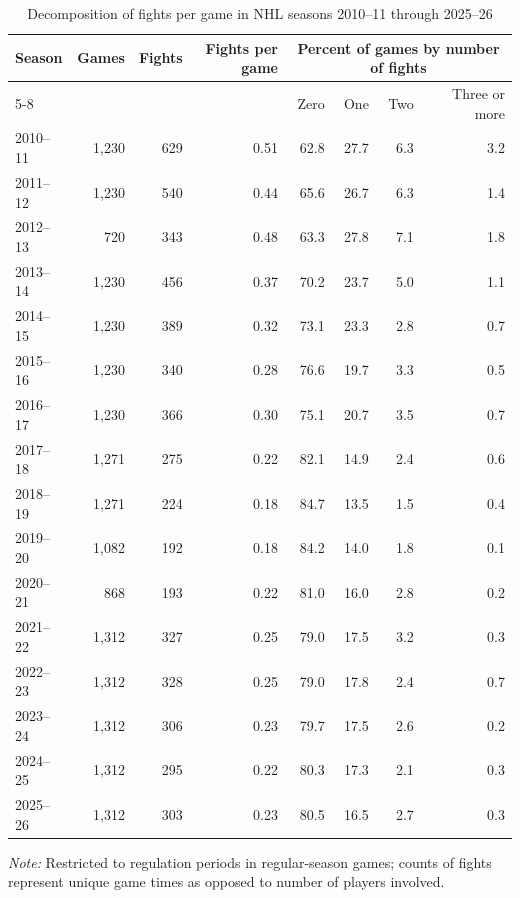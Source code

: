 \begin{table}[htbp]
\centering
\caption{Decomposition of fights per game in NHL seasons 2010--11 through 2025--26}
\label{tab:fight_activity_by_season}
\scriptsize
\renewcommand{\arraystretch}{1.12}
\setlength{\tabcolsep}{5pt}

\begin{tabular*}{\textwidth}{@{\extracolsep{\fill}}lrrrrrrr}
\toprule
Season & Games & Fights & Fights per game & \multicolumn{4}{c}{Percent of games by number of fights} \\
\cmidrule(lr){5-8}
 & & & & Zero & One & Two & Three or more \\
\midrule
2010--11 & 1,230 & 629 & 0.51 & 62.8 & 27.7 & 6.3 & 3.2 \\
2011--12 & 1,230 & 540 & 0.44 & 65.6 & 26.7 & 6.3 & 1.4 \\
2012--13 &   720 & 343 & 0.48 & 63.3 & 27.8 & 7.1 & 1.8 \\
2013--14 & 1,230 & 456 & 0.37 & 70.2 & 23.7 & 5.0 & 1.1 \\
2014--15 & 1,230 & 389 & 0.32 & 73.1 & 23.3 & 2.8 & 0.7 \\
2015--16 & 1,230 & 340 & 0.28 & 76.6 & 19.7 & 3.3 & 0.5 \\
2016--17 & 1,230 & 366 & 0.30 & 75.1 & 20.7 & 3.5 & 0.7 \\
2017--18 & 1,271 & 275 & 0.22 & 82.1 & 14.9 & 2.4 & 0.6 \\
2018--19 & 1,271 & 224 & 0.18 & 84.7 & 13.5 & 1.5 & 0.4 \\
2019--20 & 1,082 & 192 & 0.18 & 84.2 & 14.0 & 1.8 & 0.1 \\
2020--21 &   868 & 193 & 0.22 & 81.0 & 16.0 & 2.8 & 0.2 \\
2021--22 & 1,312 & 327 & 0.25 & 79.0 & 17.5 & 3.2 & 0.3 \\
2022--23 & 1,312 & 328 & 0.25 & 79.0 & 17.8 & 2.4 & 0.7 \\
2023--24 & 1,312 & 306 & 0.23 & 79.7 & 17.5 & 2.6 & 0.2 \\
2024--25 & 1,312 & 295 & 0.22 & 80.3 & 17.3 & 2.1 & 0.3 \\
2025--26 & 1,312 & 303 & 0.23 & 80.5 & 16.5 & 2.7 & 0.3 \\
\bottomrule
\end{tabular*}

\vspace{0.4em}
\parbox{0.95\textwidth}{
\footnotesize
\textit{Note:} Restricted to regulation periods in regular-season games; counts of fights represent unique game times as opposed to number of players involved.
}
\end{table}
